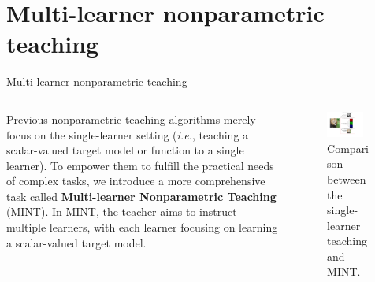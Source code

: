 \documentclass[aspectratio=169,xcolor=dvipsnames]{beamer}
\newcommand{\ie}{\textit{\fontspec{Times New Roman}i.e.}}
\begin{document}
\section{Multi-learner nonparametric teaching}
\begin{frame}{Multi-learner nonparametric teaching}
\begin{columns}
  
\begin{column}{.5\linewidth}
\justify
Previous nonparametric teaching algorithms \cite{Zhang2023NIMT} merely focus on the \alert{single-learner setting} (\ie, teaching a \alert{scalar-valued} target model or function to a single learner). To empower them to fulfill the practical needs of complex tasks, we introduce a more comprehensive task called {\bf Multi-learner Nonparametric Teaching} (MINT). In MINT, the teacher aims to instruct \alert{multiple learners}, with each learner focusing on learning a \alert{scalar-valued} target model.
\end{column}
\begin{column}{.5\textwidth}
    \begin{figure}
      \centering
      \includegraphics[width=0.8\textwidth]{comp.pdf}
      \caption{\footnotesize Comparison between the single-learner teaching and MINT.}
    \end{figure}    
\end{column}

\end{columns}
\end{frame}
\end{document}
